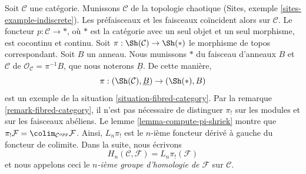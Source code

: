 \begin{example}
\label{example-category-to-point}
Soit $\mathcal{C}$ une catégorie. Munissons $\mathcal{C}$ de la topologie
chaotique (Sites, exemple \ref{sites-example-indiscrete}). Les préfaisceaux
et les faisceaux coïncident alors sur $\mathcal{C}$.
Le foncteur $p : \mathcal{C} \to *$, où $*$ est la catégorie avec un seul
objet et un seul morphisme, est cocontinu et continu. Soit
$\pi : \Sh(\mathcal{C}) \to \Sh(*)$ le morphisme de topos correspondant.
Soit $B$ un anneau. Nous munissons $*$ du faisceau d'anneaux $B$ et
$\mathcal{C}$ de $\mathcal{O}_\mathcal{C} = \pi^{-1}B$, que nous noterons
$\underline{B}$. De cette manière,
$$
\pi : (\Sh(\mathcal{C}), \underline{B}) \to (\Sh(*), B)
$$
est un exemple de la situation \ref{situation-fibred-category}.
Par la remarque \ref{remark-fibred-category}, il n'est pas nécessaire de
distinguer $\pi_!$ sur les modules et sur les faisceaux abéliens. Le
lemme \ref{lemma-compute-pi-shriek} montre que
$\pi_!\mathcal{F} = \colim_{\mathcal{C}^{opp}} \mathcal{F}$.
Ainsi, $L_n\pi_!$ est le $n$-ième foncteur dérivé à gauche du foncteur de
colimite. Dans la suite, nous écrivons
$$
H_n(\mathcal{C}, \mathcal{F}) = L_n\pi_!(\mathcal{F})
$$
et nous appelons ceci le {\it $n$-ième groupe d'homologie de $\mathcal{F}$}
sur $\mathcal{C}$.
\end{example}

